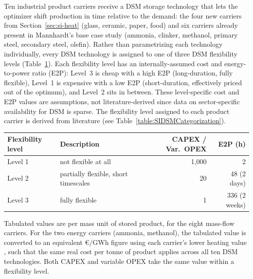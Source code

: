 Ten industrial product carriers receive a DSM storage technology that lets the optimizer shift production in time relative to the demand: the four new carriers from Section~\ref{sec:si-heat} (glass, ceramic, paper, food) and six carriers already present in Mannhardt's base case study \cite{Mannhardt2026} (ammonia, clinker, methanol, primary steel, secondary steel, olefin). Rather than parametrizing each technology individually, every DSM technology is assigned to one of three DSM flexibility levels (Table~\ref{table:SIDSMCategories}). Each flexibility level has an internally-assumed cost and energy-to-power ratio (E2P): Level~3 is cheap with a high E2P (long-duration, fully flexible), Level~1 is expensive with a low E2P (short-duration, effectively priced out of the optimum), and Level~2 sits in between. These level-specific cost and E2P values are assumptions, not literature-derived since data on sector-specific availability for DSM is sparse. The flexibility level assigned to each product carrier is derived from literature (see Table~\ref{table:SIDSMCategorization}). \\

\begin{table}[h!]
	\centering
	\label{table:SIDSMCategories}
	\begin{threeparttable}
	\begin{tabular}{llrr}
		\toprule
		Flexibility level & Description & CAPEX / Var.\ OPEX\tnote{a} & E2P (h) \\
		\midrule
        Level 1 & not flexible at all & 1{,}000 & 2 \\
        Level 2 & partially flexible, short timescales & 20 & 48 (2 days) \\
		Level 3 & fully flexible & 1 & 336 (2 weeks) \\
		\bottomrule
	\end{tabular}
	\begin{tablenotes}
		\footnotesize
		\item[a] Tabulated values are per mass unit of stored product, for the eight mass-flow carriers. For the two energy carriers (ammonia, methanol), the tabulated value is converted to an equivalent \euro/GWh figure using each carrier's lower heating value  \cite{IEAAMF2026}, such that the same real cost per tonne of product applies across all ten DSM technologies. Both CAPEX and variable OPEX take the same value within a flexibility level.
	\end{tablenotes}
	\end{threeparttable}
\end{table}

